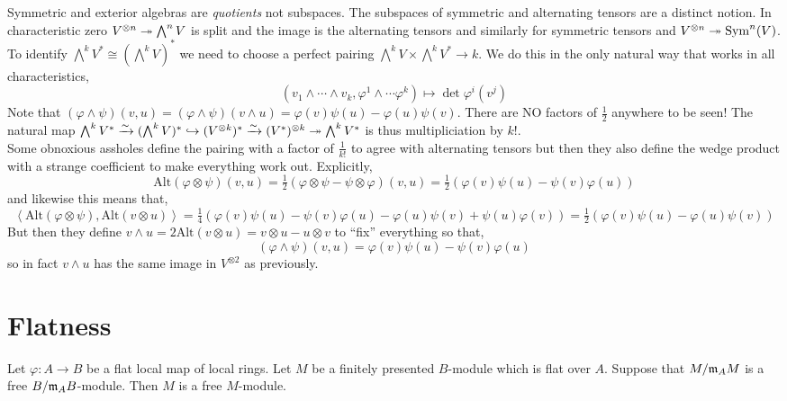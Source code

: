 \documentclass[12pt]{article}
\begin{document}
Symmetric and exterior algebras are \textit{quotients} not subspaces. The subspaces of symmetric and alternating tensors are a distinct notion. In characteristic zero $V^{\otimes n} \twoheadrightarrow \bigwedge^n V$ is split and the image is the alternating tensors and similarly for symmetric tensors and $V^{\otimes n} \twoheadrightarrow \mathrm{Sym}^n(V)$.
\bigskip\\
To identify $\bigwedge^k V^* \cong (\bigwedge^k V)^*$ we need to choose a perfect pairing $\bigwedge^k V \times \bigwedge^k V^* \to k$. We do this in the only natural way that works in all characteristics,
\[ (v_1 \wedge \cdots \wedge v_k, \varphi^1 \wedge \cdots \varphi^k) \mapsto \det{\varphi^i(v^j)} \]
Note that $(\varphi \wedge \psi)(v, u) = (\varphi \wedge \psi)(v \wedge u) = \varphi(v) \psi(u) - \varphi(u) \psi(v)$. There are NO factors of $\frac{1}{2}$ anywhere to be seen! The natural map $\bigwedge^k V^* \xrightarrow{\sim} (\bigwedge^k V)^* \hookrightarrow (V^{\otimes k})^* \xrightarrow{\sim} (V^*)^{\otimes k} \twoheadrightarrow \bigwedge^k V^*$ is thus multipliciation by $k!$. 
\bigskip\\
Some obnoxious assholes define the pairing with a factor of $\frac{1}{k!}$ to agree with alternating tensors but then they also define the wedge product with a strange coefficient to make everything work out. Explicitly,
\[ \mathrm{Alt}(\varphi \otimes \psi)(v, u) = \tfrac{1}{2} \left( \varphi \otimes \psi - \psi \otimes \varphi \right)(v, u) = \tfrac{1}{2} \left( \varphi(v) \psi(u) - \psi(v) \varphi(u) \right) \]
and likewise this means that,
\[ \left< \mathrm{Alt}(\varphi \otimes \psi), \mathrm{Alt}(v \otimes u) \right> = \tfrac{1}{4} \left( \varphi(v) \psi(u) - \psi(v) \varphi(u) - \varphi(u) \psi(v) + \psi(u) \varphi(v) \right) = \tfrac{1}{2} \left( \varphi(v) \psi(u) - \varphi(u) \psi(v) \right) \]
But then they define $v \wedge u = 2 \mathrm{Alt}(v \otimes u) = v \otimes u - u \otimes v$ to ``fix'' everything so that,
\[ (\varphi \wedge \psi)(v, u) = \varphi(v) \psi(u) - \psi(v) \varphi(u) \]
so in fact $v \wedge u$ has the same image in $V^{\otimes 2}$ as previously.


\section{Flatness}

\begin{prop}
Let $\varphi : A \to B$ be a flat local map of local rings. Let $M$ be a finitely presented $B$-module which is flat over $A$. Suppose that $M / \mathfrak{m}_A M$ is a free $B / \mathfrak{m}_A B$-module. Then $M$ is a free $M$-module. 
\end{prop}
\end{document}
